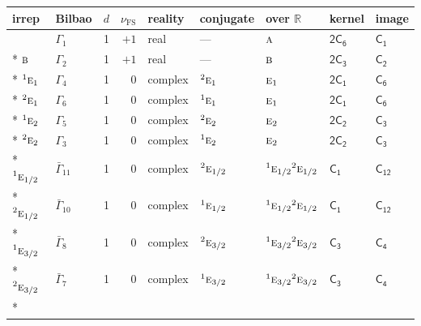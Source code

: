 \documentclass[10pt,a4paper]{article}
\makeatletter
\def\grouprule#1#2{\noalign{\marks\LTgroupmarks{\the\belowrulesep}\nobreak\vskip#1%
  \vskip\aboverulesep}\multispan\LT@cols\unskip{\leaders\hrule\@height#2\hfill\kern\z@}\cr
  \noalign{\penalty\LTrulebreak\vskip\belowrulesep\global\@lastruleclass\z@}}
\numberwithin{equation}{section}
\newcommand{\grp}[1]{\mathsf{#1}}
\newcommand{\irr}[1]{\text{\normalfont\scshape #1}}
\newcommand{\conjpair}[1]{{}^{#1}}
\newcommand{\detbox}[1]{{\setlength{\fboxsep}{1pt}\fbox{#1}}}
\newcommand{\fsind}{\nu_{\mathrm{FS}}}
\makeatother
\begin{document}
{\small\renewcommand{\arraystretch}{1.25}\setlength{\tabcolsep}{4pt}\begin{longtable}{@{}llrrlllll@{}}\toprule
irrep & Bilbao & $d$ & $\fsind$ & reality & conjugate & over $\mathbb{R}$ & kernel & image\\\midrule\endhead
\bottomrule\endfoot\endlastfoot
\detbox{$\irr{a}$} & $\Gamma_{1}$ & 1 & $+1$ & real & --- & $\irr{a}$ & \href{2C6.pdf}{$\grp{2C_{6}}$} & \href{../../../rotation/data/pdf/C1.pdf}{$\grp{C_{1}}$}\\*
$\irr{b}$ & $\Gamma_{2}$ & 1 & $+1$ & real & --- & $\irr{b}$ & \href{2C3.pdf}{$\grp{2C_{3}}$} & \href{../../../rotation/data/pdf/C2.pdf}{$\grp{C_{2}}$}\\*
$\conjpair{1}\irr{e}_{1}$ & $\Gamma_{4}$ & 1 & $0$ & complex & $\conjpair{2}\irr{e}_{1}$ & $\irr{e}_{1}$ & \href{2C1.pdf}{$\grp{2C_{1}}$} & \href{../../../rotation/data/pdf/C6.pdf}{$\grp{C_{6}}$}\\*
$\conjpair{2}\irr{e}_{1}$ & $\Gamma_{6}$ & 1 & $0$ & complex & $\conjpair{1}\irr{e}_{1}$ & $\irr{e}_{1}$ & \href{2C1.pdf}{$\grp{2C_{1}}$} & \href{../../../rotation/data/pdf/C6.pdf}{$\grp{C_{6}}$}\\*
$\conjpair{1}\irr{e}_{2}$ & $\Gamma_{5}$ & 1 & $0$ & complex & $\conjpair{2}\irr{e}_{2}$ & $\irr{e}_{2}$ & \href{2C2.pdf}{$\grp{2C_{2}}$} & \href{../../../rotation/data/pdf/C3.pdf}{$\grp{C_{3}}$}\\*
$\conjpair{2}\irr{e}_{2}$ & $\Gamma_{3}$ & 1 & $0$ & complex & $\conjpair{1}\irr{e}_{2}$ & $\irr{e}_{2}$ & \href{2C2.pdf}{$\grp{2C_{2}}$} & \href{../../../rotation/data/pdf/C3.pdf}{$\grp{C_{3}}$}\\*
\grouprule{0pt}{\lightrulewidth}
$\conjpair{1}\irr{e}_{1/2}$ & $\bar{\Gamma}_{11}$ & 1 & $0$ & complex & $\conjpair{2}\irr{e}_{1/2}$ & $\conjpair{1}\irr{e}_{1/2}\conjpair{2}\irr{e}_{1/2}$ & \href{C1.pdf}{$\grp{C_{1}}$} & \href{../../../rotation/data/pdf/C12.pdf}{$\grp{C_{12}}$}\\*
$\conjpair{2}\irr{e}_{1/2}$ & $\bar{\Gamma}_{10}$ & 1 & $0$ & complex & $\conjpair{1}\irr{e}_{1/2}$ & $\conjpair{1}\irr{e}_{1/2}\conjpair{2}\irr{e}_{1/2}$ & \href{C1.pdf}{$\grp{C_{1}}$} & \href{../../../rotation/data/pdf/C12.pdf}{$\grp{C_{12}}$}\\*
$\conjpair{1}\irr{e}_{3/2}$ & $\bar{\Gamma}_{8}$ & 1 & $0$ & complex & $\conjpair{2}\irr{e}_{3/2}$ & $\conjpair{1}\irr{e}_{3/2}\conjpair{2}\irr{e}_{3/2}$ & \href{C3.pdf}{$\grp{C_{3}}$} & \href{../../../rotation/data/pdf/C4.pdf}{$\grp{C_{4}}$}\\*
$\conjpair{2}\irr{e}_{3/2}$ & $\bar{\Gamma}_{7}$ & 1 & $0$ & complex & $\conjpair{1}\irr{e}_{3/2}$ & $\conjpair{1}\irr{e}_{3/2}\conjpair{2}\irr{e}_{3/2}$ & \href{C3.pdf}{$\grp{C_{3}}$} & \href{../../../rotation/data/pdf/C4.pdf}{$\grp{C_{4}}$}\\*

\end{longtable}}
\end{document}
